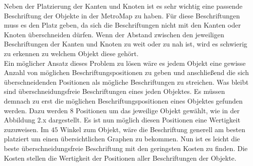 Neben der Platzierung der Kanten und Knoten ist es sehr wichtig eine passende Beschriftung der Objekte in der MetroMap zu haben. Für diese Beschriftungen muss es den Platz geben, da sich die Beschriftungen nicht mit den Kanten oder Knoten überschneiden dürfen. Wenn der Abstand zwischen den jeweiligen Beschriftungen der Kanten und Knoten zu weit oder zu nah ist, wird es schwierig zu erkennen zu welchem Objekt diese gehört. \\

Ein möglicher Ansatz dieses Problem zu lösen wäre es jedem Objekt eine gewisse Anzahl von möglichen Beschriftungspositionen zu geben und anschließend die sich überschneidenden Positionen als mögliche Beschriftungen zu streichen. Was bleibt sind überschneidungsfreie Beschriftungen eines jeden Objektes. Es müssen demnach zu erst die möglichen Beschriftungspositionen eines Objektes gefunden werden. Dazu werden 8 Positionen um das jeweilige Objekt gewählt, wie in der Abbildung 2.x dargestellt. Es ist nun möglich diesen Positionen eine Wertigkeit zuzuweisen. Im $45$ Winkel zum Objekt, wäre die Beschriftung generell am besten platziert um einen übersichtlichen Graphen zu bekommen. Nun ist es leicht die beste überschneidungsfreie Beschriftung mit den geringsten Kosten zu finden. Die Kosten stellen die Wertigkeit der Positionen aller Beschriftungen der Objekte.  
